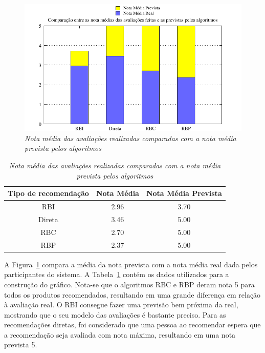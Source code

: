 \begin{figure}
    \centering
    \includegraphics[width=\textwidth]{imagens/grafico_media_prevista}
    \caption{\it Nota média das avaliações realizadas comparadas com a nota média prevista pelos algoritmos}
    \label{fig:media_prevista}
\end{figure}
\begin{table}
\centering
\begin{tabular}{c c c}
    \hline
    \hline
    \textbf{Tipo de recomendação} & \textbf{Nota Média}& \textbf{Nota Média Prevista} \\
    \hline 
RBI & 2.96 & 3.70 \\

\hline 
Direta & 3.46 & 5.00 \\
\hline 
RBC & 2.70 & 5.00 \\
\hline 
RBP & 2.37 & 5.00 \\
\hline        
\end{tabular}
\caption{\it Nota média das avaliações realizadas comparadas com a nota média prevista pelos algoritmos}
\label{table:media_prevista}
\end{table}

A Figura~\ref{fig:media_prevista} compara a média da nota prevista com a nota média real dada pelos participantes do sistema. A Tabela~\ref{table:media_prevista} contém os dados utilizados para a construção do gráfico. Nota-se que o algoritmos RBC e RBP deram nota 5 para todos os produtos recomendados, resultando em uma grande diferença em relação à avaliação real. O RBI consegue fazer uma previsão bem próxima da real, mostrando que o seu modelo das avaliações é bastante preciso. Para as recomendações diretas, foi considerado que uma pessoa ao recomendar espera que a recomendação seja avaliada com nota máxima, resultando em uma nota prevista 5.

